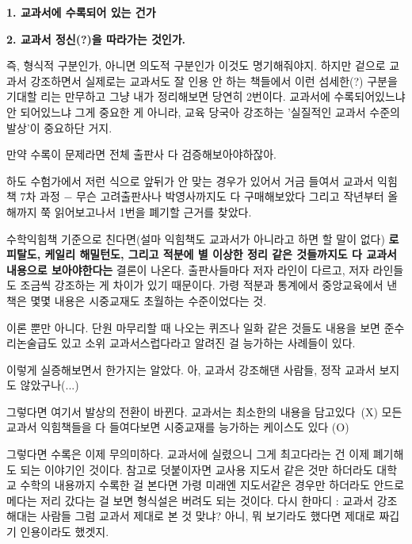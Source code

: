 \item \textbf{1. 교과서에 수록되어 있는 건가}
\item \textbf{2. 교과서 정신(?)을 따라가는 것인가.}
\vspace{5mm}

즉, 형식적 구분인가, 아니면 의도적 구분인가 이것도 명기해줘야지.
하지만 겉으로 교과서 강조하면서 실제로는 교과서도 잘 인용 안 하는 책들에서 이런 섬세한(?) 구분을 기대할 리는 만무하고
그냥 내가 정리해보면 당연히 2번이다.
교과서에 수록되어있느냐 안 되어있느냐 그게 중요한 게 아니라, 교육 당국아 강조하는 '실질적인 교과서 수준의 발상'이 중요하단 거지.
\vspace{5mm}

만약 수록이 문제라면 전체 출판사 다 검증해보아야하잖아.
\vspace{5mm}

하도 수험가에서 저런 식으로 앞뒤가 안 맞는 경우가 있어서 거금 들여서 교과서 익힘책 7차 과정 $-$ 무슨 고려출판사나 박영사까지도 다 구매해보았다
그리고 작년부터 올해까지 쭉 읽어보고나서 1번을 폐기할 근거를 찾았다.
\vspace{5mm}

수학익힘책 기준으로 친다면(설마 익힘책도 교과서가 아니라고 하면 할 말이 없다)
\textbf{로피탈도, 케일리 해밀턴도, 그리고 적분에 별 이상한 정리 같은 것들까지도 다 교과서 내용으로 보아야한다는} 결론이 나온다.
출판사들마다 저자 라인이 다르고, 저자 라인들도 조금씩 강조하는 게 차이가 있기 때문이다.
가령 적분과 통계에서 중앙교육에서 낸 책은 몇몇 내용은 시중교재도 초월하는 수준이었다는 것.
\vspace{5mm}

이론 뿐만 아니다. 단원 마무리할 때 나오는 퀴즈나 일화 같은 것들도 내용을 보면 준수리논술급도 있고
소위 교과서스럽다라고 알려진 걸 능가하는 사례들이 있다.
\vspace{5mm}

이렇게 실증해보면서 한가지는 알았다. 아, 교과서 강조해댄 사람들, 정작 교과서 보지도 않았구나(...)
\vspace{5mm}

그렇다면 여기서 발상의 전환이 바뀐다.
교과서는 최소한의 내용을 담고있다 (X)
모든 교과서 익힘책들을 다 들여다보면 시중교재를 능가하는 케이스도 있다 (O)
\vspace{5mm}

그렇다면 수록은 이제 무의미하다. 교과서에 실렸으니 그게 최고다라는 건 이제 폐기해도 되는 이야기인 것이다.
참고로 덧붙이자면 교사용 지도서 같은 것만 하더라도 대학교 수학의 내용까지 수록한 걸 본다면
가령 미래엔 지도서같은 경우만 하더라도 안드로메다는 저리 갔다는 걸 보면 형식설은 버려도 되는 것이다.
다시 한마디 : 교과서 강조해대는 사람들 그럼 교과서 제대로 본 것 맞냐? 아니, 뭐 보기라도 했다면 제대로 짜깁기 인용이라도 했겟지.
\vspace{5mm}

